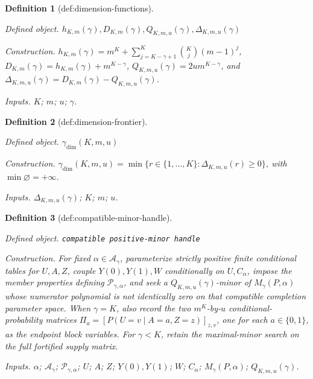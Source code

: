 \documentclass{article}
\newtheorem{definition}{Definition}
\begin{document}
\begin{definition}[def:dimension-functions]\label{def:dimension-functions}
\par\smallskip\noindent\emph{Defined object.} \(h_{K,m}(\gamma),D_{K,m}(\gamma),Q_{K,m,u}(\gamma),\Delta_{K,m,u}(\gamma)\)
\par\smallskip\noindent\emph{Construction.} \(h_{K,m}(\gamma)=m^K+\sum_{j=K-\gamma+1}^{K}\binom Kj(m-1)^j\), \(D_{K,m}(\gamma)=h_{K,m}(\gamma)+m^{K-\gamma}\), \(Q_{K,m,u}(\gamma)=2u m^{K-\gamma}\), and \(\Delta_{K,m,u}(\gamma)=D_{K,m}(\gamma)-Q_{K,m,u}(\gamma)\).
\par\smallskip\noindent\emph{Inputs.} \(K\); \(m\); \(u\); \(\gamma\).
\end{definition}

\begin{definition}[def:dimension-frontier]\label{def:dimension-frontier}
\par\smallskip\noindent\emph{Defined object.} \(\gamma_{\mathrm{dim}}(K,m,u)\)
\par\smallskip\noindent\emph{Construction.} \(\gamma_{\mathrm{dim}}(K,m,u)=\min\{r\in\{1,\ldots,K\}:\Delta_{K,m,u}(r)\ge0\}\), with \(\min\varnothing=+\infty\).
\par\smallskip\noindent\emph{Inputs.} \(\Delta_{K,m,u}(\gamma)\); \(K\); \(m\); \(u\).
\end{definition}

\begin{definition}[def:compatible-minor-handle]\label{def:compatible-minor-handle}
\par\smallskip\noindent\emph{Defined object.} \texttt{compatible positive-\allowbreak{}minor handle}
\par\smallskip\noindent\emph{Construction.} For fixed \(\alpha\in\mathcal A_\gamma\), parameterize strictly positive finite conditional tables for \(U,A,Z\), couple \(Y(0),Y(1),W\) conditionally on \(U,C_\alpha\), impose the member properties defining \(\mathcal P_{\gamma,\alpha}\), and seek a \(Q_{K,m,u}(\gamma)\)-minor of \(M_\gamma(P,\alpha)\) whose numerator polynomial is not identically zero on that compatible completion parameter space. When \(\gamma=K\), also record the two \(m^K\)-by-\(u\) conditional-probability matrices \(\Pi_a=[P(U=v\mid A=a,Z=z)]_{z,v}\), one for each \(a\in\{0,1\}\), as the endpoint block variables. For \(\gamma<K\), retain the maximal-minor search on the full fortified supply matrix.
\par\smallskip\noindent\emph{Inputs.} \(\alpha\); \(\mathcal A_\gamma\); \(\mathcal P_{\gamma,\alpha}\); \(U\); \(A\); \(Z\); \(Y(0),Y(1)\); \(W\); \(C_\alpha\); \(M_\gamma(P,\alpha)\); \(Q_{K,m,u}(\gamma)\).
\end{definition}
\end{document}

